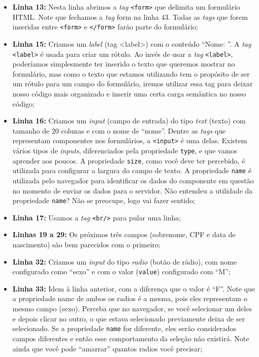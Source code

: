 \begin{itemize}
    \item \textbf{Linha 13:} Nesta linha abrimos a \textit{tag} \texttt{<form>} que delimita um formulário HTML. Note que fechamos a \textit{tag} form na linha 43. Todas as \textit{tags} que forem inseridas entre \texttt{<form>} e \texttt{</form>} farão parte do formulário;
    
    \item \textbf{Linha 15:} Criamos um \textit{label} (tag <label>) com o conteúdo ``Nome: ''. A \textit{tag} \texttt{<label>} é usada para criar um rótulo. Ao invés de usar a \textit{tag} \texttt{<label>}, poderíamos simplesmente ter inserido o texto que queremos mostrar no formulário, mas como o texto que estamos utilizando tem o propósito de ser um rótulo para um campo do formulário, iremos utilizar essa tag para deixar nosso código mais organizado e inserir uma certa carga semântica no nosso código;
    
    \item \textbf{Linha 16:} Criamos um \textit{input} (campo de entrada) do tipo \textit{text} (texto) com tamanho de 20 colunas e com o nome de ``nome''. Dentre as \textit{tags} que representam componentes nos formulários, a \texttt{<input>} é uma delas. Existem vários tipos de \textit{inputs}, diferenciados pela propriedade \texttt{type}, e que vamos aprender aos poucos. A propriedade \texttt{size}, como você deve ter percebido, é utilizada para configurar a largura do campo de texto. A propriedade \texttt{name} é utilizada pelo navegador para identificar os dados do componente em questão no momento de enviar os dados para o servidor. Não entendeu a utilidade da propriedade \texttt{name}? Não se preocupe, logo vai fazer sentido;
    
    \item \textbf{Linha 17:} Usamos a \textit{tag} \texttt{<br/>} para pular uma linha;
    
    \item \textbf{Linhas 19 a 29:} Os próximos três campos (sobrenome, CPF e data de nascimento) são bem parecidos com o primeiro;
    
    \item \textbf{Linha 32:} Criamos um \textit{input} do tipo \textit{radio} (botão de rádio), com nome configurado como ``sexo'' e com o valor (\texttt{value}) configurado com ``M'';
    
    \item \textbf{Linha 33:} Idem à linha anterior, com a diferença que o valor é ``F''. Note que a propriedade name de ambos os radios é a mesma, pois eles representam o mesmo campo (sexo). Perceba que no navegador, se você selecionar um deles e depois clicar no outro, o que estava selecionado previamente deixa de ser selecionado. Se a propriedade \texttt{name} for diferente, eles serão considerados campos diferentes e então esse comportamento da seleção não existirá. Note ainda que você pode ``amarrar'' quantos radios você precisar;
    

\end{itemize}
